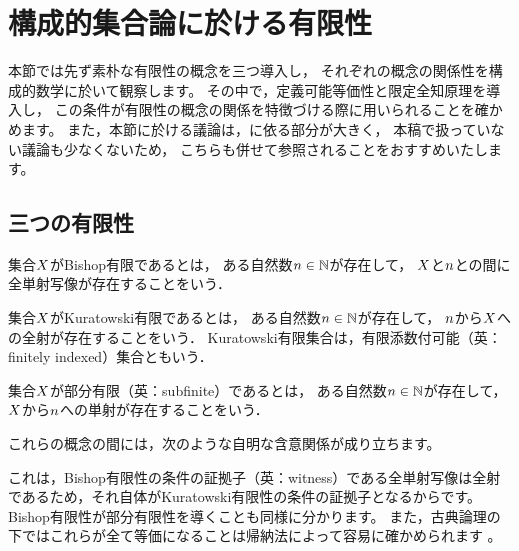 \section{構成的集合論に於ける有限性}

本節では先ず素朴な有限性の概念を三つ導入し，
それぞれの概念の関係性を構成的数学に於いて観察します。
その中で，定義可能等価性と限定全知原理を導入し，
この条件が有限性の概念の関係を特徴づける際に用いられることを確かめます。
また，本節に於ける議論は，\cite{yotsunva:2024:intro}に依る部分が大きく，
本稿で扱っていない議論も少なくないため，
こちらも併せて参照されることをおすすめいたします。

\subsection{三つの有限性}

\begin{definition}[Bishop有限性]
    集合\(\Set\)がBishop有限であるとは，
    ある自然数\(\NaturalNumber\in\NaturalNumberSet\)が存在して，
    \(\Set\)と\(\NaturalNumber\)との間に全単射写像が存在することをいう．
\end{definition}

\begin{definition}[Kuratowski有限性]
    集合\(\Set\)がKuratowski有限であるとは，
    ある自然数\(\NaturalNumber\in\NaturalNumberSet\)が存在して，
    \(\NaturalNumber\)から\(\Set\)への全射が存在することをいう．
    Kuratowski有限集合は，有限添数付可能（英：finitely indexed）集合ともいう．
\end{definition}

\begin{definition}[部分有限性]
    集合\(\Set\)が部分有限（英：subfinite）であるとは，
    ある自然数\(\NaturalNumber\in\NaturalNumberSet\)が存在して，
    \(\Set\)から\(\NaturalNumber\)への単射が存在することをいう．
\end{definition}
これらの概念の間には，次のような自明な含意関係が成り立ちます。    
\begin{center}
\end{center}
これは，Bishop有限性の条件の証拠子（英：witness）である全単射写像は全射であるため，それ自体がKuratowski有限性の条件の証拠子となるからです。
Bishop有限性が部分有限性を導くことも同様に分かります。
また，古典論理の下ではこれらが全て等価になることは帰納法によって容易に確かめられます
。

